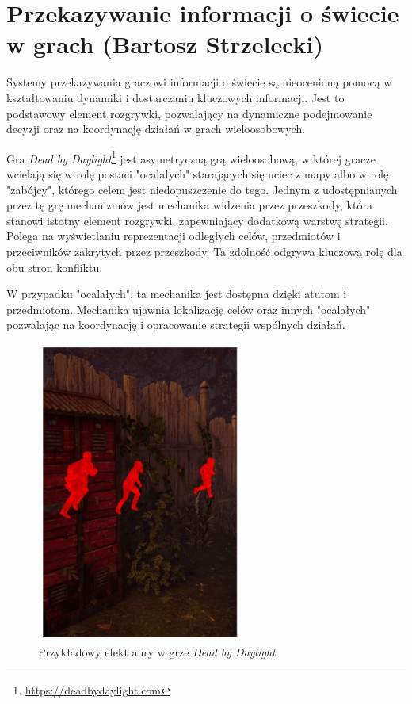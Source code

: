 \section{Przekazywanie informacji o świecie w grach (Bartosz Strzelecki)}\label{chap:dbd}
Systemy przekazywania graczowi informacji o świecie są nieocenioną pomocą w kształtowaniu dynamiki i dostarczaniu kluczowych informacji.
Jest to podstawowy element rozgrywki, pozwalający na dynamiczne podejmowanie decyzji oraz na koordynację działań w grach wieloosobowych.

Gra \textit{Dead by Daylight}\footnote{\url{https://deadbydaylight.com}} jest asymetryczną grą wieloosobową, w której gracze wcielają się w rolę postaci "ocalałych" starających się uciec
z mapy albo w rolę "zabójcy", którego celem jest niedopuszczenie do tego. Jednym z udostępnianych przez tę grę mechanizmów jest mechanika widzenia przez przeszkody, która stanowi istotny element rozgrywki, zapewniający
dodatkową warstwę strategii. Polega na wyświetlaniu reprezentacji odległych celów, przedmiotów i przeciwników
zakrytych przez przeszkody. Ta zdolność odgrywa kluczową rolę dla obu stron konfliktu.

W przypadku "ocalałych", ta mechanika jest dostępna dzięki atutom i przedmiotom. Mechanika ujawnia lokalizację celów oraz
innych "ocalałych" pozwalając na koordynację i opracowanie strategii wspólnych działań.

\begin{figure}[h]
\centering
\includegraphics[width=0.6\textwidth]{images/dbd}
\caption{Przykładowy efekt aury w grze \textit{Dead by Daylight}.}
\end{figure}

